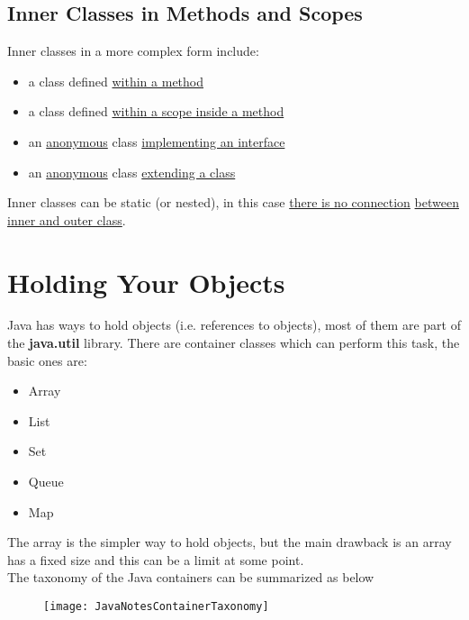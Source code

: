 \documentclass[10pt,letterpaper]{report}
\begin{document}
\section{Inner Classes in Methods and Scopes}
Inner classes in a more complex form include:
\begin{itemize}
\item a class defined \underline{within a method}
\item a class defined \underline{within a scope inside a method}
\item an \underline{anonymous} class \underline{implementing an interface}
\item an \underline{anonymous} class \underline{extending a class}
\end{itemize}

Inner classes can be static (or nested), in this case \underline{there is no connection} \underline{between inner and outer class}.
\chapter{Holding Your Objects}
Java has ways to hold objects (i.e. references to objects), most of them are part of the \textbf{java.util} library.
There are container classes which can perform this task, the basic ones are:
\begin{itemize}
\item Array
\item List
\item Set
\item Queue
\item Map
\end{itemize}
The array is the simpler way to hold objects, but the main drawback is an array has a fixed size and this can be a limit at some point.\\

The taxonomy of the Java containers can be summarized as below

\begin{figure}[htb]
\centering
\texttt{[image: JavaNotesContainerTaxonomy]}
\end{figure}
\end{document}
